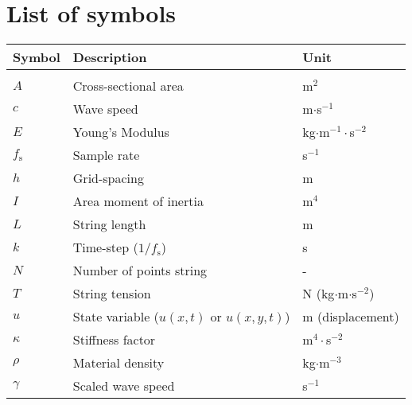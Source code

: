 \documentclass{article}
\begin{document}
\section{List of symbols} \label{app:A}
{\renewcommand{\arraystretch}{1.1}
\begin{tabular}{ p{3cm} p{7cm} p{4cm}  }
 Symbol & Description & Unit\\
 \hline\\
 $A$ & Cross-sectional area & m$^2$\\
 $c$ & Wave speed & m$\cdot$s$^{-1}$\\
 $E$ & Young's Modulus & kg$\cdot$m$^{-1}\cdot$s$^{-2}$\\
 $f_\text{s}$ & Sample rate & s$^{-1}$\\
 $h$ & Grid-spacing & m \\ 
 $I$ & Area moment of inertia \cite{Desv2017} & m$^4$\\
 $L$ & String length & m\\
 $k$ & Time-step ($1/f_\text{s}$) & s\\
 $N$ & Number of points string & -\\
 $T$ & String tension & N (kg$\cdot$m$\cdot$s$^{-2}$) \\
 $u$ & State variable ($u(x,t)\text{ or }u(x,y,t)$) & m (displacement)\\ 
 $\kappa$ & Stiffness factor & m$^4\cdot$s$^{-2}$\\
 $\rho$ & Material density & kg$\cdot$m$^{-3}$\\
 $\gamma$ & Scaled wave speed & s$^{-1}$\\
\end{tabular}
}
\end{document}
